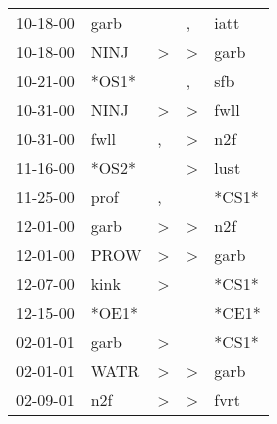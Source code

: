 \begin{supertabular}{p{0.07\textwidth}p{0.06\textwidth}p{0.02\textwidth}p{0.02\textwidth}p{0.06\textwidth}}
          10-18-00\textsuperscript{} &           garb\textsuperscript{} &                  &                , &           iatt\textsuperscript{} \\
          10-18-00\textsuperscript{} &           NINJ\textsuperscript{} &     \textgreater &     \textgreater &           garb\textsuperscript{} \\
          10-21-00\textsuperscript{} &                            *OS1* &                  &                , &            sfb\textsuperscript{} \\
          10-31-00\textsuperscript{} &           NINJ\textsuperscript{} &     \textgreater &     \textgreater &           fwll\textsuperscript{} \\
          10-31-00\textsuperscript{} &           fwll\textsuperscript{} &                , &     \textgreater &            n2f\textsuperscript{} \\
          11-16-00\textsuperscript{} &                            *OS2* &                  &     \textgreater &           lust\textsuperscript{} \\
          11-25-00\textsuperscript{} &           prof\textsuperscript{} &                , &                  &                            *CS1* \\
          12-01-00\textsuperscript{} &           garb\textsuperscript{} &     \textgreater &     \textgreater &            n2f\textsuperscript{} \\
          12-01-00\textsuperscript{} &           PROW\textsuperscript{} &     \textgreater &     \textgreater &           garb\textsuperscript{} \\
          12-07-00\textsuperscript{} &           kink\textsuperscript{} &     \textgreater &                  &                            *CS1* \\
          12-15-00\textsuperscript{} &                            *OE1* &                  &                  &                            *CE1* \\
          02-01-01\textsuperscript{} &           garb\textsuperscript{} &     \textgreater &                  &                            *CS1* \\
          02-01-01\textsuperscript{} &           WATR\textsuperscript{} &     \textgreater &     \textgreater &           garb\textsuperscript{} \\
          02-09-01\textsuperscript{} &            n2f\textsuperscript{} &     \textgreater &     \textgreater &           fvrt\textsuperscript{} \\

\end{supertabular}
